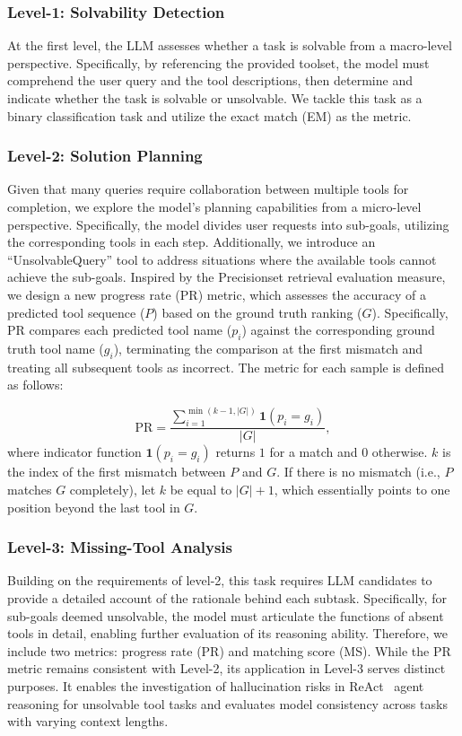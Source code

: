 \documentclass[11pt]{article}
\begin{document}
\subsubsection{Level-1: Solvability Detection}
At the first level, the LLM assesses whether a task is solvable from a macro-level perspective. 
Specifically, by referencing the provided toolset, the model must comprehend the user query and the tool descriptions, then determine and indicate whether the task is solvable or unsolvable.
We tackle this task as a binary classification task and utilize the exact match (EM) as the metric.

\subsubsection{Level-2: Solution Planning}

Given that many queries require collaboration between multiple tools for completion, we explore the model's planning capabilities from a micro-level perspective. 
Specifically, the model divides user requests into sub-goals, utilizing the corresponding tools in each step.
Additionally, we introduce an ``UnsolvableQuery'' tool to address situations where the available tools cannot achieve the sub-goals.
Inspired by the Precision\@k set retrieval evaluation measure, we design a new progress rate (PR) metric, which assesses the accuracy of a predicted tool sequence ($P$) based on the ground truth ranking ($G$).
Specifically, PR compares each predicted tool name ($p_i$) against the corresponding ground truth tool name ($g_i$), terminating the comparison at the first mismatch and treating all subsequent tools as incorrect. 
The metric for each sample is defined as follows:

\begin{equation}
\textstyle 
\text{PR} = \frac{\sum_{i=1}^{\min(k-1, |G|)} \mathbf{1}(p_i = g_i)}{|G|},
\end{equation}
where indicator function \(\mathbf{1}(p_i = g_i)\) returns $1$ for a match and $0$ otherwise.
$k$ is the index of the first mismatch between \( P \) and \( G \). If there is no mismatch (i.e., \( P \) matches \( G \) completely), let \( k \) be equal to \( |G| + 1 \), which essentially points to one position beyond the last tool in \( G \).

\subsubsection{Level-3: Missing-Tool Analysis}
Building on the requirements of level-2, this task requires LLM candidates to provide a detailed account of the rationale behind each subtask. 
Specifically, for sub-goals deemed unsolvable, the model must articulate the functions of absent tools in detail, enabling further evaluation of its reasoning ability.
Therefore, we include two metrics: progress rate (PR) and matching score (MS).
While the PR metric remains consistent with Level-2, its application in Level-3 serves distinct purposes. It enables the investigation of hallucination risks in ReAct~\cite{DBLP:conf/iclr/YaoZYDSN023@react} agent reasoning for unsolvable tool tasks and evaluates model consistency across tasks with varying context lengths.
\end{document}
